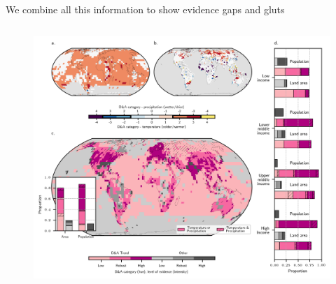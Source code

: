 \documentclass[9pt]{beamer}
\begin{document}
\begin{frame}{We combine all this information to show evidence gaps and gluts}

\begin{columns}
	\begin{column}{0.9\linewidth}
		\begin{figure}
			\includegraphics[width=\linewidth]{../figures/figure_2.png}
		\end{figure}
	\end{column}
\end{columns}

\end{frame}
\end{document}
